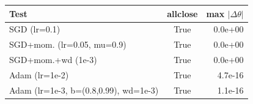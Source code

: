 \begin{tabular}{lcr}
\toprule
Test & allclose & max $|\Delta\theta|$ \\
\midrule
SGD (lr=0.1) & True & 0.0e+00 \\
SGD+mom. (lr=0.05, mu=0.9) & True & 0.0e+00 \\
SGD+mom.+wd (1e-3) & True & 0.0e+00 \\
Adam (lr=1e-2) & True & 4.7e-16 \\
Adam (lr=1e-3, b=(0.8,0.99), wd=1e-3) & True & 1.1e-16 \\
\bottomrule
\end{tabular}
